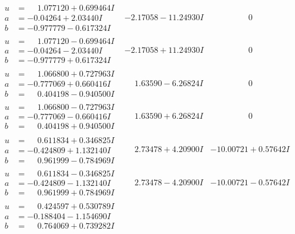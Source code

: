 \documentclass[1p]{elsarticle_modified}
\theoremstyle{definition}
\begin{document}
$$\begin{array}{c|c|c}
\begin{aligned}
u &= \phantom{-}1.077120 + 0.699464 I \\
a &= -0.04264 + 2.03440 I \\
b &= -0.977779 - 0.617324 I\end{aligned}
 & -2.17058 - 11.24930 I & \phantom{-0.000000 } 0 \\ \hline\begin{aligned}
u &= \phantom{-}1.077120 - 0.699464 I \\
a &= -0.04264 - 2.03440 I \\
b &= -0.977779 + 0.617324 I\end{aligned}
 & -2.17058 + 11.24930 I & \phantom{-0.000000 } 0 \\ \hline\begin{aligned}
u &= \phantom{-}1.066800 + 0.727963 I \\
a &= -0.777069 + 0.660416 I \\
b &= \phantom{-}0.404198 - 0.940500 I\end{aligned}
 & \phantom{-}1.63590 - 6.26824 I & \phantom{-0.000000 } 0 \\ \hline\begin{aligned}
u &= \phantom{-}1.066800 - 0.727963 I \\
a &= -0.777069 - 0.660416 I \\
b &= \phantom{-}0.404198 + 0.940500 I\end{aligned}
 & \phantom{-}1.63590 + 6.26824 I & \phantom{-0.000000 } 0 \\ \hline\begin{aligned}
u &= \phantom{-}0.611834 + 0.346825 I \\
a &= -0.424809 + 1.132140 I \\
b &= \phantom{-}0.961999 - 0.784969 I\end{aligned}
 & \phantom{-}2.73478 + 4.20900 I & -10.00721 + 0.57642 I \\ \hline\begin{aligned}
u &= \phantom{-}0.611834 - 0.346825 I \\
a &= -0.424809 - 1.132140 I \\
b &= \phantom{-}0.961999 + 0.784969 I\end{aligned}
 & \phantom{-}2.73478 - 4.20900 I & -10.00721 - 0.57642 I \\ \hline\begin{aligned}
u &= \phantom{-}0.424597 + 0.530789 I \\
a &= -0.188404 - 1.154690 I \\
b &= \phantom{-}0.764069 + 0.739282 I\end{aligned}

\end{array}$$
\end{document}
